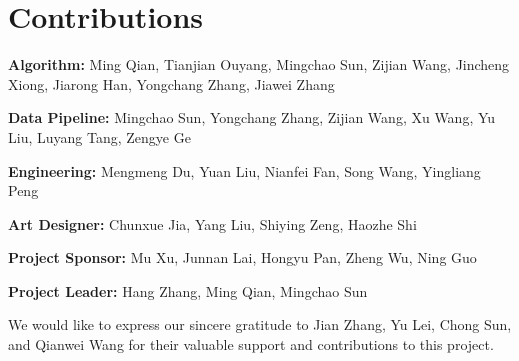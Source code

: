 \section{Contributions}

\textbf{Algorithm:} Ming Qian,  Tianjian Ouyang,  Mingchao Sun,  Zijian Wang, Jincheng Xiong, Jiarong Han, Yongchang Zhang,  Jiawei Zhang

\textbf{Data Pipeline:}  Mingchao Sun, Yongchang Zhang,  Zijian Wang, Xu Wang, Yu Liu, Luyang Tang, Zengye Ge

\textbf{Engineering:} Mengmeng Du, Yuan Liu,  Nianfei Fan, Song Wang, Yingliang Peng

\textbf{Art Designer:} Chunxue Jia, Yang Liu, Shiying Zeng,  Haozhe Shi


\textbf{Project Sponsor:} Mu Xu,  Junnan Lai,  Hongyu Pan,  Zheng Wu, Ning Guo

\textbf{Project Leader:} Hang Zhang, Ming Qian, Mingchao Sun


We would like to express our sincere gratitude to Jian Zhang, Yu Lei, Chong Sun, and Qianwei Wang for their valuable support and contributions to this project.






    



